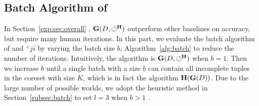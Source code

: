
\subsection{Batch Algorithm of \ours}
\label{exp:sec:batchalgo}

In Section~\ref{exp:sec:overall} , $\mathbf{G}(D,\circlearrowleft^\mathbf{H})$  outperform other baselines on accuracy, but require many human iterations. In this part, we evaluate  the batch algorithm of \ours and \ours$^+ji$ by varying the batch size $b$, \ie Algorithm~\ref{alg:batch} to reduce the number of iterations. Intuitively, the algorithm is  $\mathbf{G}(D,\circlearrowleft^\mathbf{H})$  when $b=1$. 
Then we increase $b$ until a single batch with a size $b$ can contain all incomplete tuples in the coreset with size $K$, which is in fact the algorithm $\mathbf{H}(\mathbf{G}(D))$.
 Due to the large number of possible worlds, we adopt the heuristic method in Section~\ref{subsec:batch} to set $l=3$ when $b>1$ . 

